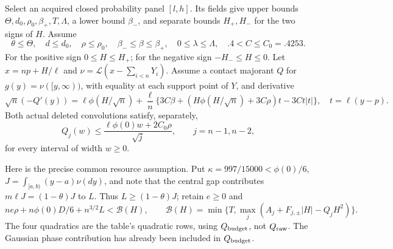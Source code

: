 \documentclass[11pt,a4paper]{article}
\numberwithin{equation}{section}
\theoremstyle{definition}
\theoremstyle{remark}
\begin{document}
Select an acquired closed probability panel $[l,h]$.
Its fields give upper bounds $\Theta,d_0,\rho_0,\beta_+,T,\Lambda$,
a lower bound $\beta_-$, and separate bounds $H_+,H_-$ for the two signs of
$H$. Assume
\[
 \theta\le\Theta,\quad d\le d_0,\quad \rho\le\rho_0,
 \quad \beta_-\le\beta\le\beta_+,\quad 0\le\lambda\le\Lambda,
 \quad .4<C\le C_0=.4253.
\]
For the positive sign $0\le H\le H_+$; for the negative sign
$-H_-\le H\le0$. Let $x=np+H/\ell$ and
$\nu=\mathcal L(x-\sum_{i<n}Y_i)$. Assume a contact majorant $Q$ for
$g(y)=\nu([y,\infty))$, with equality at each support point of $Y$,
and derivative
\begin{equation}\label{cut49:conf:derivative}
 \sqrt n(-Q'(y))=\ell\phi(H/\sqrt n)
 +\frac\ell n\{3C\beta+(H\phi(H/\sqrt n)+3C\rho)t-3Ct|t|\},
 \quad t=\ell(y-p).
\end{equation}
Both actual deleted convolutions satisfy, separately,
\begin{equation}\label{cut49:conf:concentration}
 Q_j(w)\le\frac{\ell\phi(0)w+2C_0\rho}{\sqrt j},
 \qquad j=n-1,n-2,
\end{equation}
for every interval of width $w\ge0$.

Here is the precise common resource assumption. Put
$\kappa=997/15000<\phi(0)/6$, $J=\int_{[a,b)}(y-a)\nu(dy)$,
and note that the central gap contributes $m\ell J=(1-\theta)J$ to $L$.
Thus $L\ge(1-\theta)J$; retain $e\ge0$ and
\begin{equation}\label{cut49:conf:budget}
 n e\rho+n\phi(0)D/6+n^{3/2}L<\mathcal B(H),\qquad
 \mathcal B(H)=\min\{T,\max_j(A_j+F_{j,\pm}|H|-Q_jH^2)\}.
\end{equation}
The four quadratics are the table's quadratic rows, using
$Q_{\rm budget}$, not $Q_{\rm raw}$. The Gaussian phase contribution
has already been included in $Q_{\rm budget}$.
\end{document}
